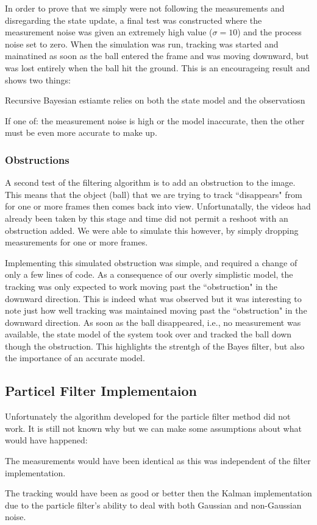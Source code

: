 In order to prove that we simply were not following the measurements and
disregarding the state update, a final test was constructed where the measurement
noise was given an extremely high value ($\sigma = 10$) and the process noise set
to zero. When the simulation was run, tracking was started and mainatined as
soon as the ball entered the frame and was moving downward, but was lost entirely
when the ball hit the ground. This is an encourageing result and shows two things:
\begin{compactitem}
\item Recursive Bayesian estiamte relies on both the state model and the observatiosn
\item If one of: the measurement noise is high or the model inaccurate, then the
other must be even more accurate to make up.
\end{compactitem}


\subsubsection{Obstructions}
A second test of the filtering algorithm is to add an obstruction to the image.
This means that the object (ball) that we are trying to track ``disappears" from
for one or more frames then comes back into view. Unfortunatally, the videos
had already been taken by this stage and time did not permit a reshoot with
an obstruction added. We were able to simulate this however, by simply dropping
measurements for one or more frames.

Implementing this simulated obstruction was simple, and required a change of
only a few lines of code. As a consequence of our overly simplistic model, the
tracking was only expected to work moving past the ``obstruction" in the
downward direction. This is indeed what was observed but it was interesting to
note just how well tracking was maintained moving past the ``obstruction" in
the downward direction. As soon as the ball disappeared, i.e., no measurement was
available, the state model of the system took over and tracked the ball down
though the obstruction. This highlights the strentgh of the Bayes filter, but also
the importance of an accurate model.

\subsection{Particel Filter Implementaion}
Unfortunately the algorithm developed for the particle filter method did not work.
It is still not known why but we can make some assumptions about what would
have happened:
\begin{compactitem}
\item The measurements would have been identical as this was independent of the
filter implementation.
\item The tracking would have been as good or better then the Kalman implementation
due to the particle filter's ability to deal with both Gaussian and non-Gaussian
noise.
\end{compactitem}

